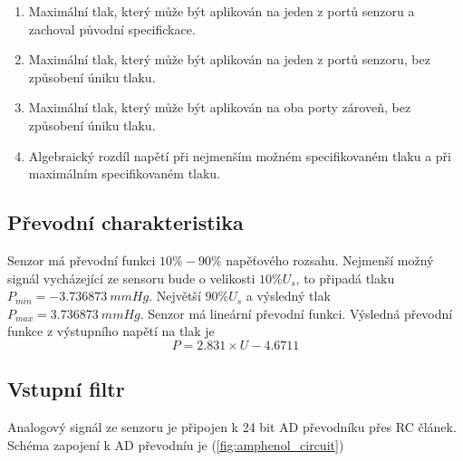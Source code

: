 \begin{table}[H]
\begin{ctucolortab}
    \end{ctucolortab}
    \begin{enumerate}
        \item \label{enum:amp_proof_pressure} Maximální tlak, který může být aplikován na jeden z portů senzoru a zachoval původní specifickace.
        \item \label{enum:amp_burst_pressure} Maximální tlak, který může být aplikován na jeden z portů senzoru, bez způsobení úniku tlaku.
        \item \label{enum:amp_common_pressure} Maximální tlak, který může být aplikován na oba porty zároveň, bez způsobení úniku tlaku.
        \item \label{enum:amp_fss} Algebraický rozdíl napětí při nejmenším možném specifikovaném tlaku a při maximálním specifikovaném tlaku.
    \end{enumerate}
\end{table}
\subsection{Převodní charakteristika}
Senzor má převodní funkci $10 \% - 90 \%$ napěťového rozsahu. Nejmenší možný signál vycházející ze sensoru bude o velikosti $10\% U_s$,
to připadá tlaku $P_{min} = -3.736873 \ mmHg$. Největší $90\% U_s$ a výsledný tlak $P_{max} = 3.736873 \ mmHg$. Senzor má lineární převodní funkci.
Výsledná převodní funkce z výstupního napětí na tlak je
\begin{equation}
    P = 2.831 \times U - 4.6711
\end{equation}
\subsection{Vstupní filtr}
Analogový signál ze senzoru je připojen k 24 bit AD převodníku přes RC článek. Schéma zapojení k AD převodníu je (\ref{fig:amphenol_circuit})


